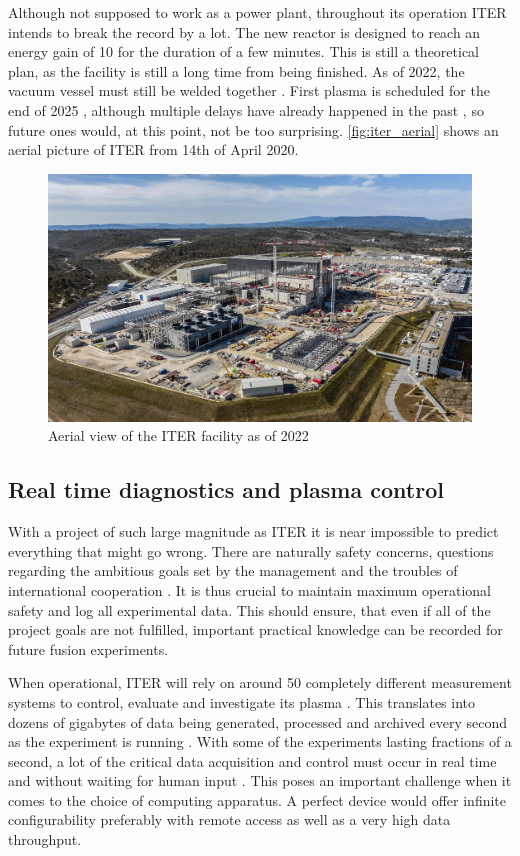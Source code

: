 	Although not supposed to work as a power plant, 
	throughout its operation ITER intends to break the record by a lot.
	The new reactor is designed to reach an energy gain of 10 
	for the duration of a few minutes. This is still a theoretical
	plan, as the facility is still a long time from being finished.
	As of 2022, the vacuum vessel must still be welded together \cite{iter_timeline}.
	First plasma is scheduled for the end of 2025 \cite{iter_timeline},
	although multiple delays have already happened in the past \cite{iter_delays},
	so future ones would, at this point, not be too surprising. 
	\autoref{fig:iter_aerial} shows an aerial picture of ITER from 14th of April 2020.
	\begin{figure}[H]
	  \centering
	  \includegraphics[width=.8\linewidth]{media/iter_aerial_2022.jpg}
	  \caption{Aerial view of the ITER facility as of 2022 \cite{iter_website}}
	  \label{fig:iter_aerial}
	\end{figure}

\subsection{Real time diagnostics and plasma control}

	With a project of such large magnitude as ITER it is near impossible to predict
	everything that might go wrong. There are naturally safety concerns,
	questions regarding the ambitious goals set by the management and
	the troubles of international cooperation \cite{iter_delays}.
	It is thus crucial to maintain maximum operational safety 
	and log all experimental data. This should ensure, that even if all
	of the project goals are not fulfilled, important practical knowledge
	can be recorded for future fusion experiments.


	When operational, ITER will rely on around 50 completely different
	measurement systems to control, evaluate and investigate its plasma 
	\cite{iter_diagnostics_count}.
	This translates into dozens of gigabytes of data being generated, 
	processed and archived every second as the experiment is running 
	\cite{iter_data_throughput}.
	With some of the experiments lasting fractions of a second,
	a lot of the critical data acquisition and control must occur
	in real time and without waiting for human input 
	\cite{iter_realtime_processing}.
	This poses an important challenge when it comes to the choice
	of computing apparatus. A perfect device would offer
	infinite configurability preferably with remote access 
	as well as a very high data throughput. 


